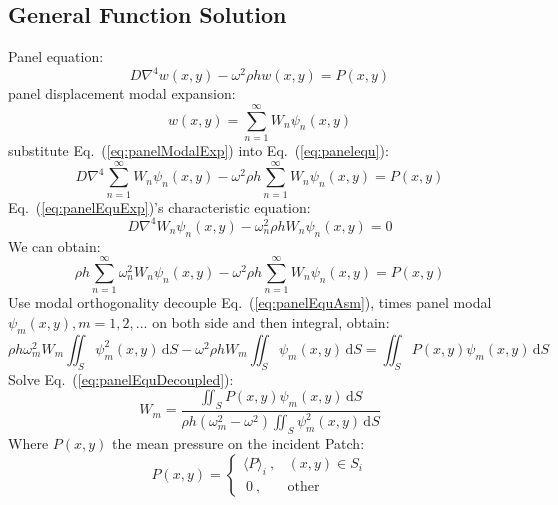 \documentclass[a4paper,UTF8]{ctexart}
\begin{document}
	\subsection{General Function Solution}
	Panel equation:
	\begin{equation}
	\label{eq:panelequ}
	D\nabla^4w\left(x,y\right)-\omega^2\rho hw\left(x,y\right)
	= P\left(x,y\right)
	\end{equation}
	panel displacement modal expansion:
	\begin{equation}
	\label{eq:panelModalExp}
	w\left(x,y\right)
	= \sum_{n=1}^{\infty}W_n\psi_n\left(x,y\right)
	\end{equation}
	substitute Eq.~(\ref{eq:panelModalExp}) into Eq.~(\ref{eq:panelequ}):
	\begin{equation}
	\label{eq:panelEquExp}
	D\nabla^4\sum_{n=1}^{\infty}W_n\psi_n\left(x,y\right) 
	- \omega^2\rho h\sum_{n=1}^{\infty}W_n\psi_n\left(x,y\right)
	= P\left(x,y\right)
	\end{equation}
	Eq.~(\ref{eq:panelEquExp})'s characteristic equation:
	\begin{equation}
	\label{eq:panelequCharacteristicEqu}
	D\nabla^4W_n\psi_n\left(x,y\right)
	- \omega_n^2\rho hW_n\psi_n\left(x,y\right)
	= 0
	\end{equation}
	We can obtain:
	\begin{equation}
	\label{eq:panelEquAsm}
	\rho h\sum_{n=1}^{\infty}\omega_n^2W_n\psi_n\left(x,y\right)
	- \omega^2\rho h\sum_{n=1}^{\infty}W_n\psi_n\left(x,y\right)
	= P\left(x,y\right)
	\end{equation}
	Use modal orthogonality decouple Eq.~(\ref{eq:panelEquAsm}), times panel modal $\psi_m\left(x,y\right),m=1,2,...$ on both side and then integral, obtain:
	\begin{equation}
	\label{eq:panelEquDecoupled}
	\rho h\omega_m^2W_m\iint_S\psi_m^2\left(x,y\right)\,\mathrm dS
	- \omega^2\rho hW_m\iint_S\psi_m\left(x,y\right)\,\mathrm dS
	= \iint_SP\left(x,y\right)\psi_m\left(x,y\right)\,\mathrm dS
	\end{equation}
	Solve Eq.~(\ref{eq:panelEquDecoupled}):
	\begin{equation}
	\label{eq:panelEquModalAns}
	W_m
	= \frac{\iint_SP\left(x,y\right)\psi_m\left(x,y\right)\,\mathrm dS}
	{\rho h\left(\omega_m^2-\omega^2\right)
		\iint_S\psi_m^2\left(x,y\right)\,\mathrm dS}
	\end{equation}
	Where $P\left(x,y\right)$ the mean pressure on the incident Patch:
	\begin{equation}
	P\left(x,y\right)
	= \begin{cases}
		\langle P\rangle_i\ ,&\left(x,y\right)\in S_i\\
		\ 0\  ,&\mathrm{other}
	\end{cases}
	\end{equation}
\end{document}
